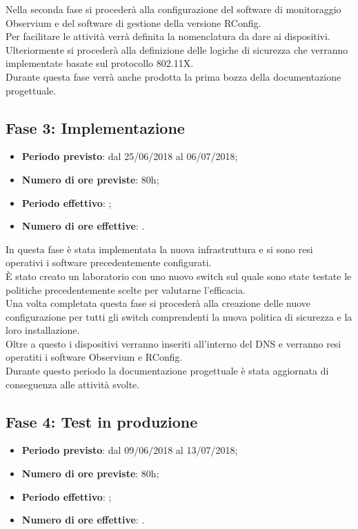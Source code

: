 \documentclass[Tesi.tex]{subfiles}
\begin{document}
Nella seconda fase si procederà alla configurazione del software di monitoraggio Observium e del software di gestione della versione RConfig. \\
Per facilitare le attività verrà definita la nomenclatura da dare ai dispositivi.\\
Ulteriormente si procederà alla definizione delle logiche di sicurezza che verranno implementate basate sul protocollo 802.11X. \\
Durante questa fase verrà anche prodotta la prima bozza della documentazione progettuale.
	

\subsection{Fase 3: Implementazione}
\begin{itemize}
	\item \textbf{Periodo previsto}: dal 25/06/2018 al 06/07/2018;
	\item \textbf{Numero di ore previste}: 80h;
	\item \textbf{Periodo effettivo}: ;
	\item \textbf{Numero di ore effettive}: .
\end{itemize}
	
In questa fase è stata implementata la nuova infrastruttura e si sono resi operativi i software precedentemente configurati. \\
\`{E} stato creato un laboratorio con uno nuovo switch sul quale sono state testate le politiche precedentemente scelte per valutarne l'efficacia.\\
Una volta completata questa fase si procederà alla creazione delle nuove configurazione per tutti gli switch comprendenti la nuova politica di sicurezza e la loro installazione. \\
Oltre a questo i dispositivi verranno inseriti all'interno del DNS e verranno resi operatiti i software Observium e RConfig. \\
Durante questo periodo la documentazione progettuale è stata aggiornata di conseguenza alle attività svolte.\\
	

\subsection{Fase 4: Test in produzione}
\begin{itemize}
	\item \textbf{Periodo previsto}: dal 09/06/2018 al 13/07/2018;
	\item \textbf{Numero di ore previste}: 80h;
	\item \textbf{Periodo effettivo}: ;
	\item \textbf{Numero di ore effettive}: .
\end{itemize}
	
\end{document}
